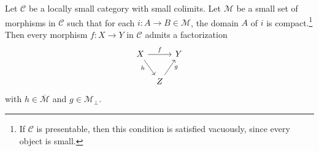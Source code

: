 \documentclass[main.tex]{subfiles}
\begin{document}
\begin{lemma}
  \label{lemma:small_object_argument}
  Let $\mathcal{C}$ be a locally small category with small colimits. Let $\mathcal{M}$ be a small set of morphisms in $\mathcal{C}$ such that for each $i\colon A \to B \in \mathcal{M}$, the domain $A$ of $i$ is compact.\footnote{If $\mathcal{C}$ is presentable, then this condition is satisfied vacuously, since every object is small.} Then every morphism $f\colon X \to Y$ in $\mathcal{C}$ admits a factorization
  \begin{equation*}
    \begin{tikzcd}[column sep=tiny]
      X
      \arrow[rr, "f"]
      \arrow[rd, swap, near start, "h"]
      && Y
      \\
      & Z
      \arrow[ur, swap, near end, "g"]
    \end{tikzcd}
  \end{equation*}
  with $h \in \overline{\mathcal{M}}$ and $g \in \mathcal{M}_{\perp}$.
\end{lemma}
\end{document}

